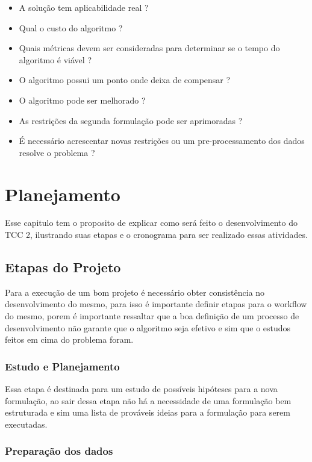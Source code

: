 \begin{itemize}
    \item A solução tem aplicabilidade real ?
    \item Qual o custo do algoritmo ?
    \item Quais métricas devem ser consideradas para determinar se o tempo do algoritmo é viável ?
    \item O algoritmo possui um ponto onde deixa de compensar ?
    \item O algoritmo pode ser melhorado ? 
    \item As restrições da segunda formulação pode ser aprimoradas ?
    \item É necessário acrescentar novas restrições ou um pre-processamento dos dados resolve o problema ?  
\end{itemize}


\chapter{Planejamento}

Esse capitulo tem o proposito de explicar como será feito o desenvolvimento do TCC 2, ilustrando suas etapas e o cronograma para ser realizado essas atividades.  

\section{Etapas do Projeto}

Para a execução de um bom projeto é necessário obter consistência no desenvolvimento do mesmo, para isso é importante definir etapas para o workflow do mesmo, porem é importante ressaltar que a boa definição de um processo de desenvolvimento não garante que o algoritmo seja efetivo e sim que o estudos feitos em cima do problema foram. 


\subsection{Estudo e Planejamento}

Essa etapa é destinada para um estudo de possíveis hipóteses para a nova formulação, ao sair dessa etapa não há a necessidade de uma formulação bem estruturada e sim uma lista de prováveis ideias para a formulação para serem executadas.

\subsection{Preparação dos dados}

